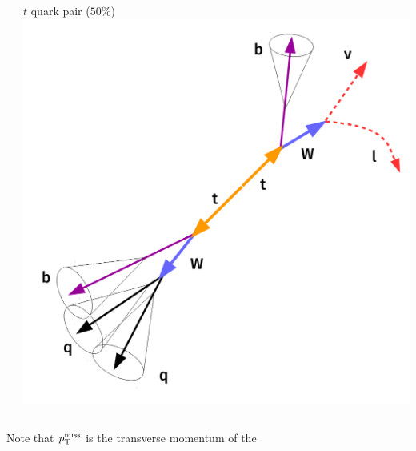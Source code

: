 \documentclass[aspectratio=169,xcolor=dvipsnames,,table,compress]{beamer}
\begin{document}
\begin{frame}[t]
\begin{columns}
\begin{column}{0.33\textwidth}
  \end{column}
  \begin{column}{0.33\textwidth}
    \centering
    $t$ quark pair ($50\%$) \\
    \includegraphics[width=\textwidth]{../figures/talk/ttsr.pdf} \pause
  \end{column}
  \end{columns}
  {\large
    Note that $p_\text{T}^\text{miss}$ is the transverse momentum of the 
  }
\end{frame}
% 
\end{document}
